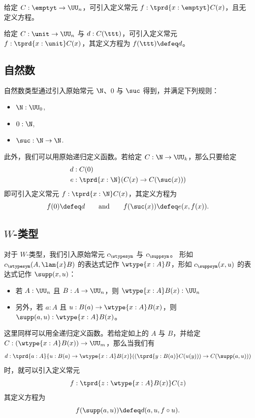 给定 $C : \emptyt \rightarrow \UU_n$，可引入定义常元 $f:\tprd{x:\emptyt} C(x)$，且无定义方程。

给定 $C : \unit \rightarrow \UU_n$ 与 $d : C(\ttt)$，可引入定义常元 $f:\tprd{x:\unit} C(x)$，其定义方程为 $f(\ttt) \defeq d$。

\subsection{自然数}

自然数类型通过引入原始常元
$\N$、$0$ 与 $\suc$ 得到，并满足下列规则：
%
\begin{itemize}
  \item $\N : \UU_0$,
  \item $0:\N$,
  \item $\suc:\N\rightarrow \N$.
\end{itemize}
%
此外，我们可以用原始递归定义函数。若给定
$C : \N \rightarrow \UU_k $，那么只要给定
%
\begin{align*}
  d & : C(0) \\
  e & : \tprd{x:\N}(C(x)\rightarrow C(\suc (x)))
\end{align*}
%
即可引入定义常元 $f:\tprd{x:\N}C(x)$，其定义方程为
%
\begin{equation*}
  f(0) \defeq d
  \qquad\text{and}\qquad
  f(\suc (x)) \defeq e(x,f(x)).
\end{equation*}

\subsection{\texorpdfstring{$W$}{W}-类型}

对于 $W$-类型，我们引入原始常元 $c_\wtypesym$ 与 $c_\suppsym$。
形如 $c_\wtypesym(A,\lam{x} B)$ 的表达式记作
$\wtype{x:A}B$，形如 $c_\suppsym(x,u)$ 的表达式记作
$\supp(x,u)$：
%
\begin{itemize}
\item 若 $A:\UU_n$ 且 $B: A \rightarrow \UU_n$，则 $\wtype{x:A}B(x) : \UU_n$
\item 另外，若 $a:A$ 且 $u:B(a)\rightarrow \wtype{x:A}B(x)$，则 $\supp(a,u):\wtype{x:A}B(x)$。
\end{itemize}
% 
这里同样可以用全递归定义函数。若给定如上的 $A$ 与 $B$，并给定 $C : (\wtype{x:A}B(x)) \rightarrow \UU_m$，那么当我们有
\[
  d:\tprd{a:A}{u:B(a) \rightarrow \wtype{x:A}B(x)}((\tprd{y:B(a)}C(u(y))) \rightarrow C(\supp(a,u)))
\]
时，就可以引入定义常元
\[
  f:\tprd{z:\wtype{x:A}B(x)} C(z)
\]
其定义方程为
\[
  f(\supp(a,u)) \defeq d(a,u,f\circ u).
\]

